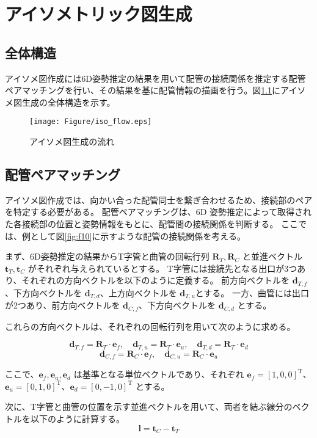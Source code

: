 \chapter{アイソメトリック図生成}
\section{全体構造}
アイソメ図作成には6D姿勢推定の結果を用いて配管の接続関係を推定する配管ペアマッチングを行い、その結果を基に配管情報の描画を行う。図\ref{fig:f9}にアイソメ図生成の全体構造を示す。
\begin{figure}[htbt]
  \centering
   \texttt{[image: Figure/iso\_flow.eps]}
   \caption{アイソメ図生成の流れ}
   \label{fig:f9}
\end{figure}

\section{配管ペアマッチング}
アイソメ図作成では、向かい合った配管同士を繋ぎ合わせるため、接続部のペアを特定する必要がある。
配管ペアマッチングは、6D 姿勢推定によって取得された各接続部の位置と姿勢情報をもとに、配管間の接続関係を判断する。
ここでは、例として図\ref{fig:f10}に示すような配管の接続関係を考える。

まず、6D姿勢推定の結果からT字管と曲管の回転行列 $\mathbf{R}_T, \mathbf{R}_C$ と並進ベクトル $\mathbf{t}_T, \mathbf{t}_C$ がそれぞれ与えられているとする。
T字管には接続先となる出口が3つあり、それぞれの方向ベクトルを以下のように定義する。
前方向ベクトルを $\mathbf{d}_{T,f}$、下方向ベクトルを $\mathbf{d}_{T,d}$、上方向ベクトルを $\mathbf{d}_{T,u}$とする。
一方、曲管には出口が2つあり、前方向ベクトルを $\mathbf{d}_{C,f}$、下方向ベクトルを $\mathbf{d}_{C,d}$ とする。

これらの方向ベクトルは、それぞれの回転行列を用いて次のように求める。

\[
\mathbf{d}_{T,f} = \mathbf{R}_T \cdot \mathbf{e}_f, \quad 
\mathbf{d}_{T,u} = \mathbf{R}_T \cdot \mathbf{e}_u, \quad 
\mathbf{d}_{T,d} = \mathbf{R}_T \cdot \mathbf{e}_d
\]
\[
\mathbf{d}_{C,f} = \mathbf{R}_C \cdot \mathbf{e}_f, \quad 
\mathbf{d}_{C,u} = \mathbf{R}_C \cdot \mathbf{e}_u
\]

ここで、$\mathbf{e}_f, \mathbf{e}_u, \mathbf{e}_d$ は基準となる単位ベクトルであり、それぞれ $\mathbf{e}_f = [1, 0, 0]^\mathrm{T}$、$\mathbf{e}_u = [0, 1, 0]^\mathrm{T}$、$\mathbf{e}_d = [0, -1, 0]^\mathrm{T}$ とする。

次に、T字管と曲管の位置を示す並進ベクトルを用いて、両者を結ぶ線分のベクトルを以下のように計算する。
\[
\mathbf{l} = \mathbf{t}_C - \mathbf{t}_T
\]

